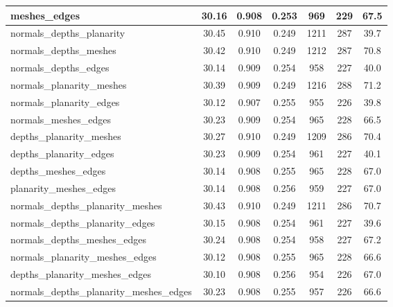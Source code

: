 \begin{table}[h]
{\begin{tabular}{@{}l|ccc|ccc@{}}
meshes\_edges & 30.16 & 0.908 & \cellcolor{green!20}0.253 & 969 & 229 & 67.5 \\
\midrule
normals\_depths\_planarity & 30.45 & \cellcolor{green!40}0.910 & \cellcolor{green!40}0.249 & 1211 & 287 & 39.7 \\
normals\_depths\_meshes & 30.42 & \cellcolor{green!40}0.910 & \cellcolor{green!40}0.249 & 1212 & 287 & 70.8 \\
normals\_depths\_edges & 30.14 & \cellcolor{green!20}0.909 & 0.254 & 958 & \cellcolor{green!40}227 & 40.0 \\
normals\_planarity\_meshes & 30.39 & \cellcolor{green!20}0.909 & \cellcolor{green!40}0.249 & 1216 & 288 & 71.2 \\
normals\_planarity\_edges & 30.12 & 0.907 & 0.255 & \cellcolor{green!40}955 & \cellcolor{green!40}226 & 39.8 \\
normals\_meshes\_edges & 30.23 & \cellcolor{green!20}0.909 & 0.254 & 965 & \cellcolor{green!20}228 & 66.5 \\
depths\_planarity\_meshes & 30.27 & \cellcolor{green!40}0.910 & \cellcolor{green!40}0.249 & 1209 & 286 & 70.4 \\
depths\_planarity\_edges & 30.23 & \cellcolor{green!20}0.909 & 0.254 & 961 & \cellcolor{green!40}227 & 40.1 \\
depths\_meshes\_edges & 30.14 & 0.908 & 0.255 & 965 & \cellcolor{green!20}228 & 67.0 \\
planarity\_meshes\_edges & 30.14 & 0.908 & 0.256 & 959 & \cellcolor{green!40}227 & 67.0 \\
\midrule
normals\_depths\_planarity\_meshes & 30.43 & \cellcolor{green!40}0.910 & \cellcolor{green!40}0.249 & 1211 & 286 & 70.7 \\
normals\_depths\_planarity\_edges & 30.15 & 0.908 & 0.254 & 961 & \cellcolor{green!40}227 & 39.6 \\
normals\_depths\_meshes\_edges & 30.24 & 0.908 & 0.254 & 958 & \cellcolor{green!40}227 & 67.2 \\
normals\_planarity\_meshes\_edges & 30.12 & 0.908 & 0.255 & 965 & \cellcolor{green!20}228 & 66.6 \\
depths\_planarity\_meshes\_edges & 30.10 & 0.908 & 0.256 & \cellcolor{green!70}954 & \cellcolor{green!70}226 & 67.0 \\
\midrule
normals\_depths\_planarity\_meshes\_edges & 30.23 & 0.908 & 0.255 & 957 & \cellcolor{green!70}226 & 66.6 \\
\bottomrule
\end{tabular}%
}
\end{table}
